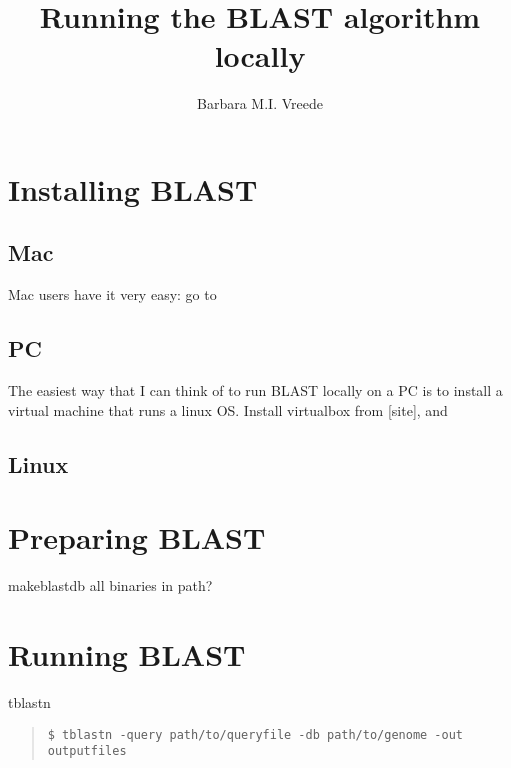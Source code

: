 \documentclass[11pt]{article}
\title{Running the BLAST algorithm locally}
\author{Barbara M.I. Vreede}
\begin{document}
\maketitle
\section{Installing BLAST}
\subsection{Mac}
Mac users have it very easy: go to 
\subsection{PC}
The easiest way that I can think of to run BLAST locally on a PC is to install a virtual machine that runs a linux OS. 
Install virtualbox from [site], and 

\subsection{Linux}

\section{Preparing BLAST}
makeblastdb
all binaries in path?

\section{Running BLAST}
tblastn

\begin{quote}
\begin{verbatim}
$ tblastn -query path/to/queryfile -db path/to/genome -out outputfiles
\end{verbatim}
\end{quote}
\end{document}
